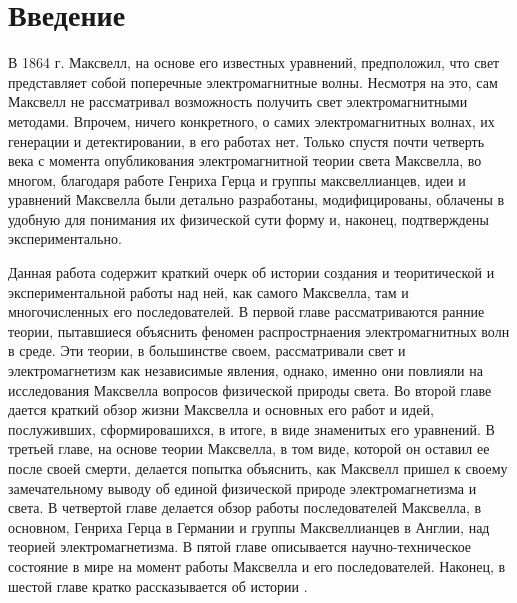 \documentclass[12pt, oneside, a4paper]{article}
\begin{document}
\section*{Введение}
В 1864 г. Максвелл, на основе его известных уравнений, предположил, что свет представляет собой поперечные электромагнитные волны. Несмотря на это, сам Максвелл не рассматривал возможность получить свет электромагнитными методами. Впрочем, ничего конкретного, о самих электромагнитных волнах, их генерации и детектировании, в его работах нет. Только спустя почти четверть века с момента опубликования электромагнитной теории света Максвелла, во многом, благодаря работе Генриха Герца и группы максвеллианцев, идеи и уравнений Максвелла были детально разработаны, модифицированы, облачены в удобную для понимания их физической сути форму и, наконец, подтверждены экспериментально.

Данная работа содержит краткий очерк об истории создания и теоритической и экспериментальной работы над ней, как самого Максвелла, там и многочисленных его последователей. В первой главе рассматриваются ранние теории, пытавшиеся объяснить феномен распрострнаения электромагнитных волн в среде. Эти теории, в большинстве своем, рассматривали свет и электромагнетизм как независимые явления, однако, именно они повлияли на исследования Максвелла вопросов физической природы света. Во второй главе дается краткий обзор жизни Максвелла и основных его работ и идей, послуживших, сформировашихся, в итоге, в виде знаменитых его уравнений. В третьей главе, на основе теории Максвелла, в том виде, которой он оставил ее после своей смерти, делается попытка объяснить, как Максвелл пришел к своему замечательному выводу об единой физической природе электромагнетизма и света. В четвертой главе делается обзор работы последователей Максвелла, в основном, Генриха Герца в Германии и группы Максвеллианцев в Англии, над теорией электромагнетизма. В пятой главе описывается научно-техническое состояние в мире на момент работы Максвелла и его последователей. Наконец, в шестой главе кратко  рассказывается об истории .
\end{document}
